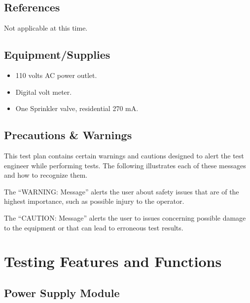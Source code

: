 \documentclass{article}
\begin{document}
\subsection{References}

Not applicable at this time.


\subsection{Equipment/Supplies}

\begin{itemize}
\item 110 volts AC power outlet.
\item Digital volt meter.
\item One Sprinkler valve, residential 270 mA.
\end{itemize}

\subsection{Precautions \& Warnings}

This test plan contains certain warnings and cautions designed to alert the
test engineer while performing tests. The following illustrates each of
these messages and how to recognize them.


The ``WARNING: Message'' alerts the user about safety issues that are of
the highest importance, such as possible injury to the operator.


The ``CAUTION: Message'' alerts the user to issues concerning possible
damage to the equipment or that can lead to erroneous test results.


\section{Testing Features and Functions}

\subsection{Power Supply Module}
\end{document}
